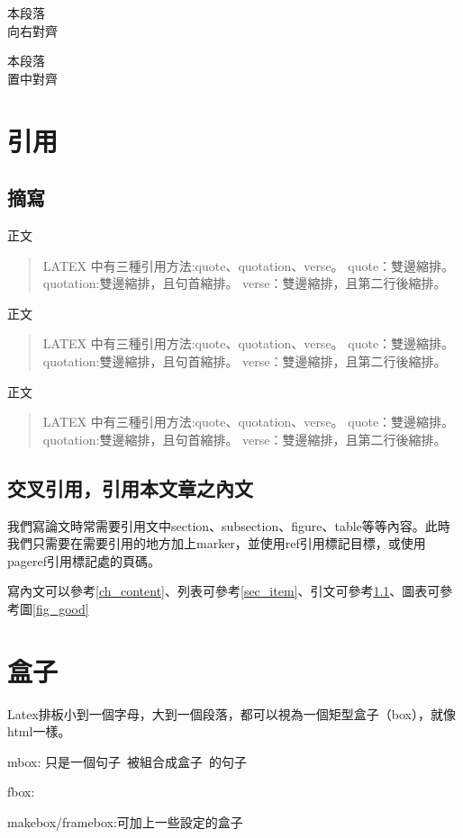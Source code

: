 \begin{flushright}
    本段落\\
    向右對齊
\end{flushright}

\begin{center}
    本段落\\
    置中對齊
\end{center}

\section{引用}
\subsection{摘寫}\label{ssec_qute}
正文
\begin{quote}
    LATEX 中有三種引用方法:quote、quotation、verse。
    quote：雙邊縮排。
    quotation:雙邊縮排，且句首縮排。
    verse：雙邊縮排，且第二行後縮排。
\end{quote}
正文
\begin{quotation}
    LATEX 中有三種引用方法:quote、quotation、verse。
    quote：雙邊縮排。
    quotation:雙邊縮排，且句首縮排。
    verse：雙邊縮排，且第二行後縮排。
\end{quotation}
正文
\begin{verse}
    LATEX 中有三種引用方法:quote、quotation、verse。
    quote：雙邊縮排。
    quotation:雙邊縮排，且句首縮排。
    verse：雙邊縮排，且第二行後縮排。
\end{verse}

\subsection{交叉引用，引用本文章之內文}
我們寫論文時常需要引用文中section、subsection、figure、table等等內容。此時我們只需要在需要引用的地方加上marker，並使用ref引用標記目標，或使用pageref引用標記處的頁碼。

寫內文可以參考\ref{ch_content}、列表可參考\ref{sec_item}、引文可參考\ref{ssec_qute}、圖表可參考圖\ref{fig_good}

\newpage
\section{盒子}
Latex排板小到一個字母，大到一個段落，都可以視為一個矩型盒子（box），就像html一樣。

mbox:
\mbox{只是一個句子 被組合成盒子 的句子}

fbox:

makebox/framebox:可加上一些設定的盒子




\newpage